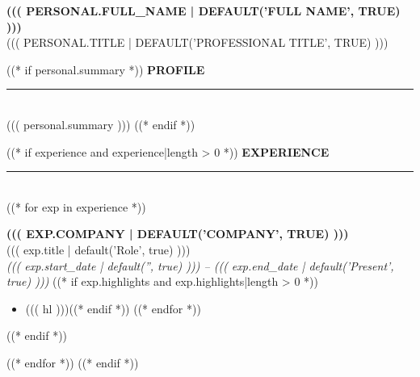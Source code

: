 \documentclass[11pt,a4paper]{article}
\begin{document}
\hfill
\begin{minipage}[t]{0.60\textwidth}
\color{body}
\vspace{8mm}
\hspace{2mm}
\begin{minipage}[t]{0.90\textwidth}

{\fontsize{26}{30}\selectfont\bfseries\color{navy}\MakeUppercase{((( personal.full_name | default('Full Name', true) )))}}\\[4pt]
{\fontsize{10}{12}\selectfont\color{muted}\MakeUppercase{((( personal.title | default('Professional Title', true) )))}}

\vspace{8pt}

((* if personal.summary *))
{\fontsize{11}{13}\selectfont\bfseries\color{navy}\MakeUppercase{Profile}}\\[2pt]
{\color{navy!30}\rule{\linewidth}{0.4pt}}\\[6pt]
{\small ((( personal.summary )))}
\vspace{9pt}
((* endif *))

((* if experience and experience|length > 0 *))
{\fontsize{11}{13}\selectfont\bfseries\color{navy}\MakeUppercase{Experience}}\\[2pt]
{\color{navy!30}\rule{\linewidth}{0.4pt}}\\[8pt]
((* for exp in experience *))
\noindent
\begin{minipage}[t]{3mm}
\end{minipage}\hspace{3mm}%
\begin{minipage}[t]{0.90\textwidth}
{\small\bfseries\MakeUppercase{((( exp.company | default('Company', true) )))}}\\
{\small\color{muted} ((( exp.title | default('Role', true) )))}\\
{\small\color{muted}\textit{((( exp.start_date | default('', true) ))) -- ((( exp.end_date | default('Present', true) )))}}
((* if exp.highlights and exp.highlights|length > 0 *))
\begin{itemize}[leftmargin=12pt, itemsep=1pt, parsep=0pt, topsep=3pt]
((* for hl in exp.highlights *))((* if hl *))\item {\small ((( hl )))}((* endif *))
((* endfor *))
\end{itemize}
((* endif *))
\end{minipage}
\vspace{7pt}
((* endfor *))
((* endif *))


\end{minipage}
\end{minipage}
\end{document}
